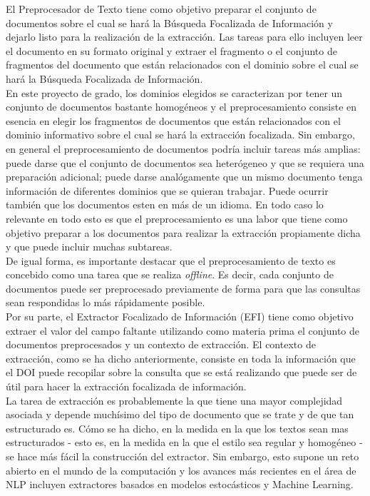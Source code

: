 El Preprocesador de Texto tiene como objetivo preparar el conjunto de documentos sobre el cual se hará la Búsqueda Focalizada de Información y dejarlo listo para la realización de la extracción. Las tareas para ello incluyen leer el documento en su formato original y extraer el fragmento o el conjunto de fragmentos del documento que están relacionados con el dominio sobre el cual se hará la Búsqueda Focalizada de Información. \\

En este proyecto de grado, los dominios elegidos se caracterizan por tener un conjunto de documentos bastante homogéneos y el preprocesamiento consiste en esencia en elegir los fragmentos de documentos que están relacionados con el dominio informativo sobre el cual se hará la extracción focalizada. Sin embargo, en general el preprocesamiento de documentos podría incluir tareas más amplias: puede darse que el conjunto de documentos sea heterógeneo y que se requiera una preparación adicional; puede darse analógamente que un mismo documento tenga información de diferentes dominios que se quieran trabajar. Puede ocurrir también que los documentos esten en más de un idioma. En todo caso lo relevante en todo esto es que el preprocesamiento es una labor que tiene como objetivo preparar a los documentos para realizar la extracción propiamente dicha y que puede incluir muchas subtareas.   \\

De igual forma, es importante destacar que el preprocesamiento de texto es concebido como una tarea que se realiza \emph{offline}. Es decir, cada conjunto de documentos puede ser preprocesado previamente de forma para que las consultas sean respondidas lo más rápidamente posible. \\

Por su parte, el Extractor Focalizado de Información (EFI) tiene como objetivo extraer el valor del campo faltante utilizando como materia prima el conjunto de documentos preprocesados y un contexto de extracción. El contexto de extracción, como se ha dicho anteriormente, consiste en toda la información que el DOI puede recopilar sobre la consulta que se está realizando que puede ser de útil para hacer la extracción focalizada de información. \\

La tarea de extracción es probablemente la que tiene una mayor complejidad asociada y depende muchísimo del tipo de documento que se trate y de que tan estructurado es. Cómo se ha dicho, en la medida en la que los textos sean mas estructurados - esto es, en la medida en la que el estilo sea regular y homogéneo - se hace más fácil la construcción del extractor. Sin embargo, esto supone un reto abierto en el mundo de la computación y los avances más recientes en el área de NLP incluyen extractores basados en modelos estocásticos y Machine Learning. \\

